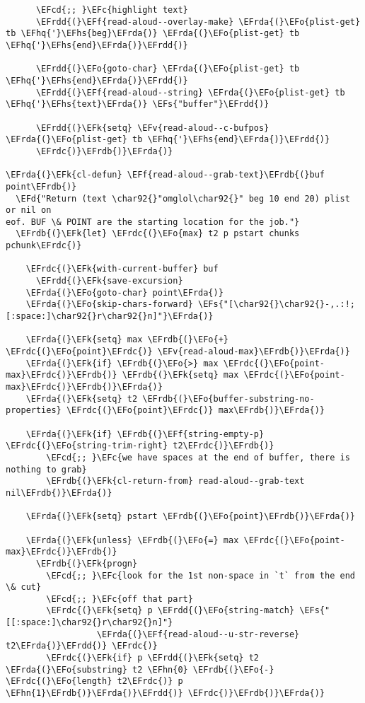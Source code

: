 \documentclass[a4wide,10pt]{article}
\newcommand{\EFc}[1]{\textcolor{EFc}{#1}} %
\newcommand{\EFcd}[1]{\textcolor{EFcd}{#1}} %
\newcommand{\EFs}[1]{\textcolor{EFs}{#1}} %
\newcommand{\EFd}[1]{\textcolor{EFd}{#1}} %
\newcommand{\EFk}[1]{\textcolor{EFk}{#1}} %
\newcommand{\EFf}[1]{\textcolor{EFf}{#1}} %
\newcommand{\EFv}[1]{\textcolor{EFv}{#1}} %
\newcommand{\EFo}[1]{\textcolor{EFo}{#1}} %
\newcommand{\EFhn}[1]{\textcolor{EFhn}{\textbf{#1}}} %
\newcommand{\EFhq}[1]{\textcolor{EFhq}{#1}} %
\newcommand{\EFhs}[1]{\textcolor{EFhs}{#1}} %
\newcommand{\EFrda}[1]{\textcolor{EFrda}{#1}} %
\newcommand{\EFrdb}[1]{\textcolor{EFrdb}{#1}} %
\newcommand{\EFrdc}[1]{\textcolor{EFrdc}{#1}} %
\newcommand{\EFrdd}[1]{\textcolor{EFrdd}{#1}} %
\begin{document}
\begin{Code}
\begin{Verbatim}
      \EFcd{;; }\EFc{highlight text}
      \EFrdd{(}\EFf{read-aloud--overlay-make} \EFrda{(}\EFo{plist-get} tb \EFhq{'}\EFhs{beg}\EFrda{)} \EFrda{(}\EFo{plist-get} tb \EFhq{'}\EFhs{end}\EFrda{)}\EFrdd{)}

      \EFrdd{(}\EFo{goto-char} \EFrda{(}\EFo{plist-get} tb \EFhq{'}\EFhs{end}\EFrda{)}\EFrdd{)}
      \EFrdd{(}\EFf{read-aloud--string} \EFrda{(}\EFo{plist-get} tb \EFhq{'}\EFhs{text}\EFrda{)} \EFs{"buffer"}\EFrdd{)}

      \EFrdd{(}\EFk{setq} \EFv{read-aloud--c-bufpos} \EFrda{(}\EFo{plist-get} tb \EFhq{'}\EFhs{end}\EFrda{)}\EFrdd{)}
      \EFrdc{)}\EFrdb{)}\EFrda{)}

\EFrda{(}\EFk{cl-defun} \EFf{read-aloud--grab-text}\EFrdb{(}buf point\EFrdb{)}
  \EFd{"Return (text \char92{}"omglol\char92{}" beg 10 end 20) plist or nil on
eof. BUF \& POINT are the starting location for the job."}
  \EFrdb{(}\EFk{let} \EFrdc{(}\EFo{max} t2 p pstart chunks pchunk\EFrdc{)}

    \EFrdc{(}\EFk{with-current-buffer} buf
      \EFrdd{(}\EFk{save-excursion}
	\EFrda{(}\EFo{goto-char} point\EFrda{)}
	\EFrda{(}\EFo{skip-chars-forward} \EFs{"[\char92{}\char92{}-,.:!;[:space:]\char92{}r\char92{}n]"}\EFrda{)}

	\EFrda{(}\EFk{setq} max \EFrdb{(}\EFo{+} \EFrdc{(}\EFo{point}\EFrdc{)} \EFv{read-aloud-max}\EFrdb{)}\EFrda{)}
	\EFrda{(}\EFk{if} \EFrdb{(}\EFo{>} max \EFrdc{(}\EFo{point-max}\EFrdc{)}\EFrdb{)} \EFrdb{(}\EFk{setq} max \EFrdc{(}\EFo{point-max}\EFrdc{)}\EFrdb{)}\EFrda{)}
	\EFrda{(}\EFk{setq} t2 \EFrdb{(}\EFo{buffer-substring-no-properties} \EFrdc{(}\EFo{point}\EFrdc{)} max\EFrdb{)}\EFrda{)}

	\EFrda{(}\EFk{if} \EFrdb{(}\EFf{string-empty-p} \EFrdc{(}\EFo{string-trim-right} t2\EFrdc{)}\EFrdb{)}
	    \EFcd{;; }\EFc{we have spaces at the end of buffer, there is nothing to grab}
	    \EFrdb{(}\EFk{cl-return-from} read-aloud--grab-text nil\EFrdb{)}\EFrda{)}

	\EFrda{(}\EFk{setq} pstart \EFrdb{(}\EFo{point}\EFrdb{)}\EFrda{)}

	\EFrda{(}\EFk{unless} \EFrdb{(}\EFo{=} max \EFrdc{(}\EFo{point-max}\EFrdc{)}\EFrdb{)}
	  \EFrdb{(}\EFk{progn}
	    \EFcd{;; }\EFc{look for the 1st non-space in `t` from the end \& cut}
	    \EFcd{;; }\EFc{off that part}
	    \EFrdc{(}\EFk{setq} p \EFrdd{(}\EFo{string-match} \EFs{"[[:space:]\char92{}r\char92{}n]"}
				  \EFrda{(}\EFf{read-aloud--u-str-reverse} t2\EFrda{)}\EFrdd{)} \EFrdc{)}
	    \EFrdc{(}\EFk{if} p \EFrdd{(}\EFk{setq} t2 \EFrda{(}\EFo{substring} t2 \EFhn{0} \EFrdb{(}\EFo{-} \EFrdc{(}\EFo{length} t2\EFrdc{)} p \EFhn{1}\EFrdb{)}\EFrda{)}\EFrdd{)} \EFrdc{)}\EFrdb{)}\EFrda{)}


\end{Verbatim}
\end{Code}
\end{document}
